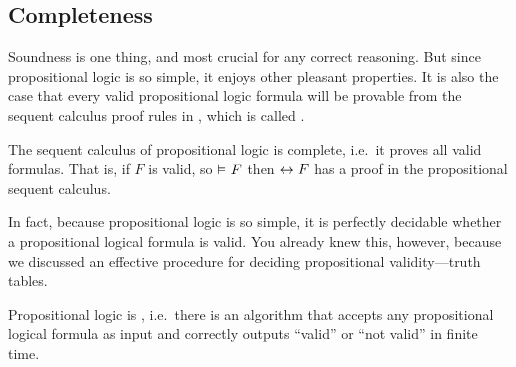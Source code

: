\documentclass[11pt,twoside]{scrartcl}
\newcommand{\asfml}{F}
\begin{document}
\subsection{Completeness}

Soundness is one thing, and most crucial for any correct reasoning.
But since propositional logic is so simple, it enjoys other pleasant properties.
It is also the case that every valid propositional logic formula will be provable from the sequent calculus proof rules in , which is called .

\begin{theorem}
  The sequent calculus of propositional logic is complete, i.e.\ it proves all valid formulas.
  That is, if $\asfml$ is valid, so \(\entails \asfml\) then \(\lsequent{}{\asfml}\) has a proof in the propositional sequent calculus.
\end{theorem}

In fact, because propositional logic is so simple, it is perfectly decidable whether a propositional logical formula is valid. You already knew this, however, because we discussed an effective procedure for deciding propositional validity---truth tables.

\begin{theorem}
  Propositional logic is , i.e.\ there is an algorithm that accepts any propositional logical formula as input and correctly outputs ``valid'' or ``not valid'' in finite time.
\end{theorem}



% 

\end{document}
